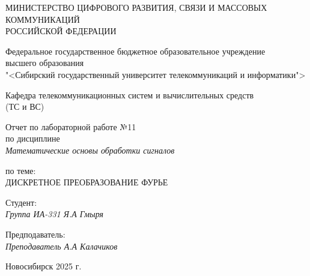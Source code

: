 \thispagestyle{empty}

\begin{center}
    МИНИСТЕРСТВО ЦИФРОВОГО РАЗВИТИЯ, СВЯЗИ И МАССОВЫХ КОММУНИКАЦИЙ \\ РОССИЙСКОЙ ФЕДЕРАЦИИ

    \vspace{20pt}

    Федеральное государственное бюджетное образовательное учреждение  \\  высшего образования \\
    "<Сибирский государственный университет телекоммуникаций и информатики"> \\

    \vspace{20pt}

    Кафедра телекоммуникационных систем и вычислительных средств \\  (ТС и ВС)
\end{center}

\vfill

\begin{center}
    Отчет по лабораторной работе №11 \\  
    по дисциплине \\
    \textit{Математические основы обработки сигналов}

    \vspace{20pt}

    по теме: \\
    \uppercase{Дискретное преобразование Фурье}
\end{center}

\vfill

    \noindent Студент: \\
    \textit{Группа ИА-331 \hfill Я.А Гмыря}

    \vspace{20pt}

    \noindent Предподаватель: \\
    \textit{Преподаватель \hfill А.А Калачиков}

\vfill

\begin{center}
    Новосибирск 2025 г.
\end{center}